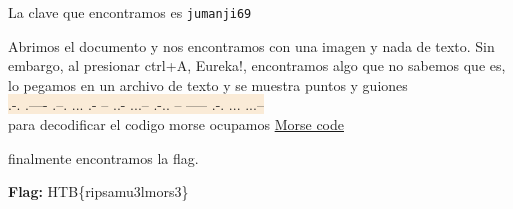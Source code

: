 \documentclass[letterpaper,10pt]{article}
\newcommand{\hlc}[2][antiquewhite]{ \colorbox{#1}{\ttfamily #2} }
\begin{document}

La clave que encontramos es \texttt{jumanji69}

Abrimos el documento y nos encontramos con una imagen y nada de texto. Sin embargo, al presionar ctrl+A, Eureka!, encontramos algo que no sabemos que es, lo pegamos en un archivo de texto y se muestra puntos y guiones\\

\hlc{.-. .---- .--. ... .- -- ..- ...-- .-.. -- ----- .-. ... ...--}\\

para decodificar el codigo morse ocupamos \href{https://morsecode.scphillips.com/translator.html}{Morse code}

finalmente encontramos la flag.

\textbf{Flag: }HTB\{ripsamu3lmors3\}
\end{document}
